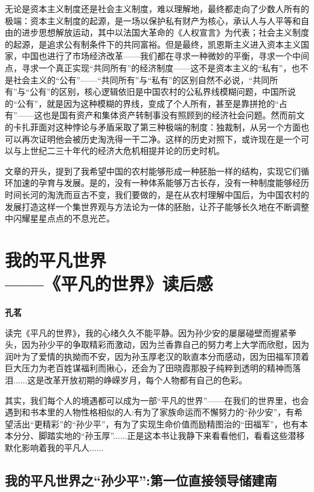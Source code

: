 \documentclass[openany,scheme = chinese, linespread = 1.5]{ctexbook}
\newcommand \name[1]{\begin{center} \kaishu \Large \bfseries #1 \end{center}}
\begin{document}
无论是资本主义制度还是社会主义制度，难以理解地，最终都走向了少数人所有的极端：资本主义制度的起源，是一场以保护私有财产为核心，承认人与人平等和自由的进步思想解放运动，其中以法国大革命的《人权宣言》为代表；社会主义制度的起源，是追求公有制条件下的共同富裕。但是最终，凯恩斯主义进入资本主义国家，中国也进行了市场经济改革——我们都在寻求一种微妙的平衡，寻求一个中间点，寻求一个真正实现“共同所有”的经济制度——这不是资本主义的“私有”，也不是社会主义的“公有”——“共同所有”与“私有”的区别自然不必说，“共同所有”与“公有”的区别，核心逻辑依旧是中国农村的公私界线模糊问题，中国所说的“公有”，就是因为这种模糊的界线，变成了个人所有，甚至是靠拼抢的“占有”——这也是国有资产和集体资产转制事没有照顾到的经济社会问题。然而前文的卡扎菲面对这种悖论与矛盾采取了第三种极端的制度：独裁制，从另一个方面也可以再次证明他会被历史淘洗得一干二净。这样的历史对照下，或许现在是一个可以与上世纪二三十年代的经济大危机相提并论的历史时机。

文章的开头，提到了我希望中国的农村能够形成一种胚胎一样的结构，实现它们循环加速的孕育与发展。是的，没有一种体系能够万古长存，没有一种制度能够经历时间长河的淘洗而亘古不变，我们要做的，是在从农村理解中国后，为中国农村的发展打造这样一个集世界观与方法论为一体的胚胎，让芥子能够长久地在不断调整中闪耀星星点点的不息光芒。

\newpage
\section{我的平凡世界\\——《平凡的世界》读后感}
\name{孔茗}

    读完《平凡的世界》，我的心绪久久不能平静。因为孙少安的屡屡碰壁而握紧拳头，因为孙少平的争取精彩而激动，因为兰香靠自己的努力考上大学而欣慰，因为润叶为了爱情的执拗而不安，因为孙玉厚老汉的耿直本分而感动，因为田福军顶着巨大压力为老百姓谋福利而揪心，还会为了田晓霞那股子纯粹到透明的精神而落泪......这是改革开放初期的峥嵘岁月，每个人物都有自己的色彩。 
    
    其实，我们每个人的境遇都可以成为一部“平凡的世界”——在我们的世界里，也会遇到和书本里的人物性格相似的人:有为了家族命运而不懈努力的“孙少安”，有希望活出“更精彩”的“孙少平”，有为了实现生命价值而励精图治的“田福军”，也有本本分分、脚踏实地的“孙玉厚”......正是这本书让我静下来看看他们，看看这些潜移默化影响着我的平凡人...... 

\subsection*{我的平凡世界之“孙少平”:第一位直接领导储建南}
\end{document}
